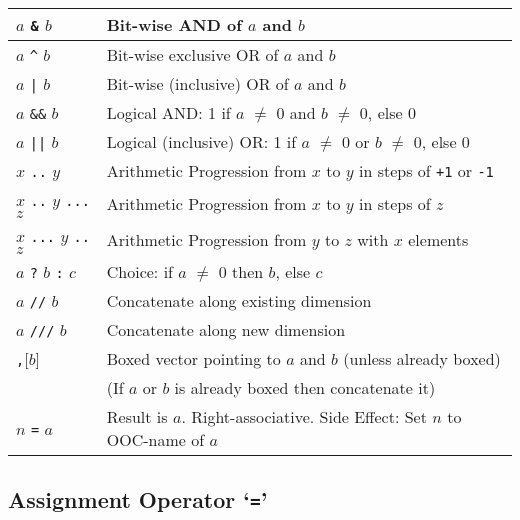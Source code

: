 \begin{tabular}{|l|l|}
    \hline
        $a$
        \texttt{\&}
        $b$
       & 
      Bit-wise AND of 
      $a$ and 
      $b$
    \\
    \hline
        $a$
        \texttt{\^}
        $b$
       & 
      Bit-wise exclusive OR of 
      $a$ and 
      $b$
    \\
    \hline
        $a$
        \texttt{|}
        $b$
       & 
      Bit-wise (inclusive) OR of 
      $a$ and 
      $b$
    \\
    \hline
        $a$
        \texttt{\&\&}
        $b$
       & 
      Logical AND: 1 if 
      $a$ $\neq$ 0 and 
      $b$ $\neq$ 0, else 0
    \\
    \hline
        $a$
        \texttt{||}
        $b$
       & 
      Logical (inclusive) OR: 1 if 
      $a$ $\neq$ 0 or 
      $b$ $\neq$ 0, else 0
    \\
    \hline
        $x$
        \texttt{..}
        $y$
       & 
      Arithmetic Progression from 
      $x$ to 
      $y$ in steps of 
      \texttt{+1} or 
      \texttt{-1}
    \\
        $x$
        \texttt{..}
        $y$
        \texttt{...}
        $z$
       & 
      Arithmetic Progression from 
      $x$ to 
      $y$ in steps of 
      $z$
    \\
        $x$
        \texttt{...}
        $y$
        \texttt{..}
        $z$
       & 
      Arithmetic Progression from 
      $y$ to 
      $z$ with 
      $x$ elements
    \\
    \hline
        $a$
        \texttt{?}
        $b$
        \texttt{:}
        $c$
       & 
      Choice: if 
      $a$ $\neq$ 0 then 
      $b$, else 
      $c$
    \\
    \hline
        $a$
        \texttt{//}
        $b$
       & 
      Concatenate along existing dimension
    \\
        $a$
        \texttt{///}
        $b$
       & 
      Concatenate along new dimension
    \\
    \hline
      [$a$]\texttt{,}[$b$]
	& 
      Boxed vector pointing to $a$ and $b$ (unless already boxed)
    \\
	& 
      (If $a$ or $b$ is already boxed then concatenate it)
    \\
    \hline
        $n$ \texttt{=} $a$
       & 
      Result is $a$. Right-associative. Side Effect: Set $n$ to OOC-name of $a$
    \\
    \hline
\end{tabular}

\subsection{Assignment Operator `\texttt{=}'}
    \label{op-Assignment}
  
